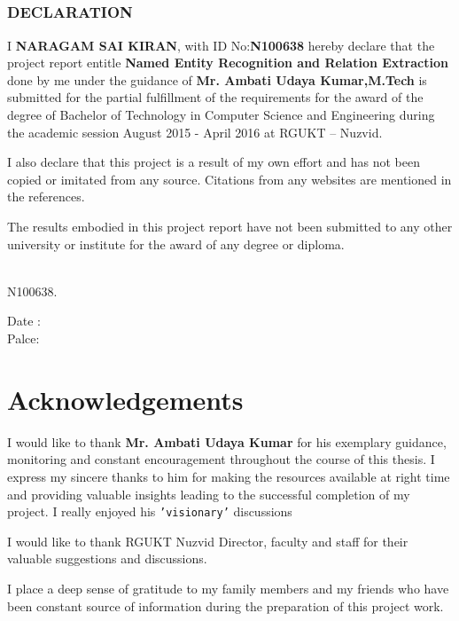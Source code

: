 \documentclass[12pt]{report}
\newcommand*{\Signature}[1]{
	\vspace{3cm}
    \par\noindent\makebox[5cm]{\hrulefill}
    \par\noindent\makebox[5cm][l]{#1}
}
\begin{document}
\section*{}
\thispagestyle{fancy}
\begin{center}\makebox[15cm]{\hrulefill}\end{center}
\vspace{1cm}
\begin{center}
\subsection*{DECLARATION\\\makebox[5cm]{\hrulefill}}

\end{center}
\par I \textbf{NARAGAM SAI KIRAN}, with ID No:\textbf{N100638} hereby declare that the
 project report entitle \textbf{Named Entity Recognition and Relation Extraction} done by me
 under the guidance of \textbf{Mr. Ambati Udaya Kumar,M.Tech} is submitted for the partial
  fulfillment of the requirements for the award of the degree of Bachelor of Technology
   in Computer Science and Engineering during the academic session August 2015 - April 2016 at RGUKT – Nuzvid.

\par I also declare that this project is a result of my own effort and has not been copied or imitated from any source.
 Citations from any websites are mentioned in the references.
\par The results embodied in this project report have not been submitted to any other university or institute for the award of any degree or diploma.

\Signature{N. SAI KIRAN,}\\N100638.\\
\begin{flushright}
Date : \makebox[3cm]{\hrulefill}\\
Palce: \makebox[3cm]{\hrulefill}\\
\end{flushright}
\pagebreak

\chapter*{Acknowledgements}
\par I would like to thank \textbf{Mr. Ambati Udaya Kumar} for his exemplary guidance, monitoring and constant encouragement throughout the course of this thesis.
	I express my sincere thanks to him for making the resources available at right time and providing valuable insights leading to the successful completion of my project.
I really enjoyed his \texttt{'visionary'} discussions
	\par I would like to thank RGUKT Nuzvid Director, faculty and staff for their valuable suggestions and discussions.
	\par I place a deep sense of gratitude to my family members and my friends who have been constant source of information during the preparation of this project work.
\end{document}
